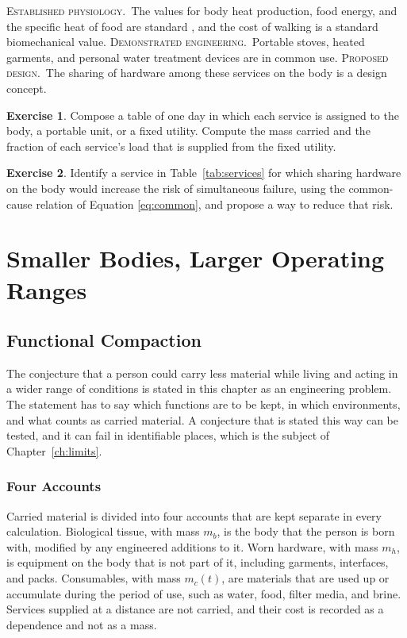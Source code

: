 \documentclass[11pt,openany]{book}
\theoremstyle{definition}
\newtheorem{exercise}{Exercise}[chapter]
\theoremstyle{remark}
\newcommand{\est}{\textsc{Established physiology.}\ }
\newcommand{\dem}{\textsc{Demonstrated engineering.}\ }
\newcommand{\pro}{\textsc{Proposed design.}\ }
\begin{document}
\begin{evidence}
\est The values for body heat production, food energy, and the specific heat of food are standard \cite{guyton2021}, and the cost of walking is a standard biomechanical value. \dem Portable stoves, heated garments, and personal water treatment devices are in common use. \pro The sharing of hardware among these services on the body is a design concept.
\end{evidence}

\begin{exercise}
Compose a table of one day in which each service is assigned to the body, a portable unit, or a fixed utility. Compute the mass carried and the fraction of each service's load that is supplied from the fixed utility.
\end{exercise}

\begin{exercise}
Identify a service in Table~\ref{tab:services} for which sharing hardware on the body would increase the risk of simultaneous failure, using the common-cause relation of Equation \eqref{eq:common}, and propose a way to reduce that risk.
\end{exercise}

\part{Smaller Bodies, Larger Operating Ranges}

\chapter{Functional Compaction}
\label{ch:compaction}

The conjecture that a person could carry less material while living and acting in a wider range of conditions is stated in this chapter as an engineering problem. The statement has to say which functions are to be kept, in which environments, and what counts as carried material. A conjecture that is stated this way can be tested, and it can fail in identifiable places, which is the subject of Chapter~\ref{ch:limits}.

\section{Four Accounts}

Carried material is divided into four accounts that are kept separate in every calculation. Biological tissue, with mass $m_b$, is the body that the person is born with, modified by any engineered additions to it. Worn hardware, with mass $m_h$, is equipment on the body that is not part of it, including garments, interfaces, and packs. Consumables, with mass $m_c(t)$, are materials that are used up or accumulate during the period of use, such as water, food, filter media, and brine. Services supplied at a distance are not carried, and their cost is recorded as a dependence and not as a mass.
\end{document}
